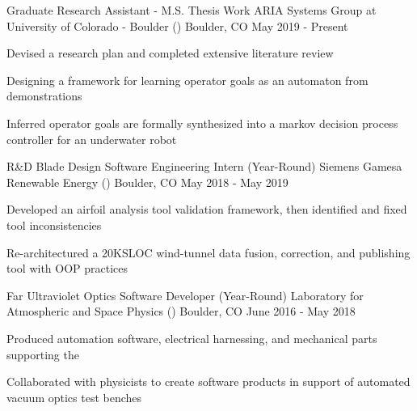 \begin{cventries}
  \cventry
    {Graduate Research Assistant - M.S. Thesis Work}
    {ARIA Systems Group at University of Colorado - Boulder ()}
    {Boulder, CO}
    {May 2019 - Present}
    {
      \begin{cvitems}
        \item {Devised a research plan and completed extensive literature review}
        \item {Designing a framework for learning operator goals as an automaton from demonstrations}
        \item {Inferred operator goals are formally synthesized into a markov decision process controller for an underwater robot}
      \end{cvitems}
    }
    \cventry
    {R\&D Blade Design Software Engineering Intern (Year-Round)}
    {Siemens Gamesa Renewable Energy ()}
    {Boulder, CO}
    {May 2018 - May 2019}
    {
      \begin{cvitems}
        \item {Developed an airfoil analysis tool validation framework, then identified and fixed tool inconsistencies}
        \item {Re-architectured a 20KSLOC wind-tunnel data fusion, correction, and publishing tool with OOP practices}
      \end{cvitems}
    }

  \cventry
    {Far Ultraviolet Optics Software Developer (Year-Round)}
    {Laboratory for Atmospheric and Space Physics () }
    {Boulder, CO}
    {June 2016 - May 2018}
    {
      \begin{cvitems}
        \item {Produced automation software, electrical harnessing, and mechanical parts supporting the }
        \item {Collaborated with physicists to create software products in support of automated vacuum optics test benches}
      \end{cvitems}
    }
\end{cventries}
